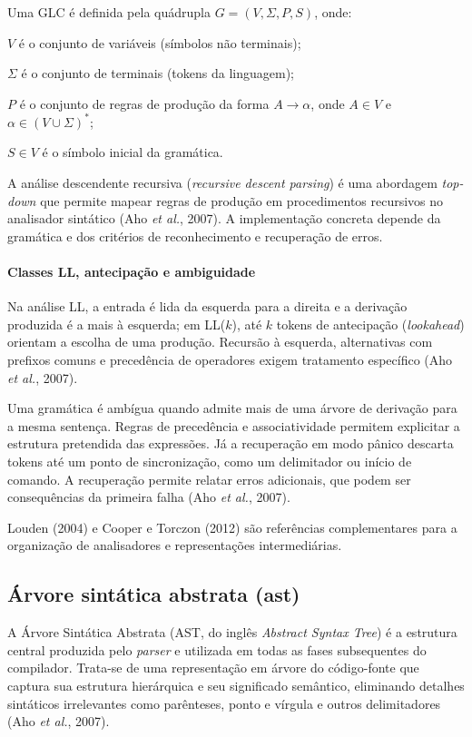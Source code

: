 \documentclass[
    12pt
    ,oneside
    ,a4paper
    ,chapter=TITLE
    ,section=TITLE
    ,sumario=abnt-6027-2012]{abntex2}
\newcommand{\citeAho}{(Aho \textit{et al.}, 2007)}
\begin{document}
Uma GLC é definida pela quádrupla $ G = (V, \Sigma, P, S) $, onde:

\begin{alineas}
    \item $ V $ é o conjunto de variáveis (símbolos não terminais);
    \item $ \Sigma $ é o conjunto de terminais (tokens da linguagem);
    \item $ P $ é o conjunto de regras de produção da forma $ A \rightarrow \alpha $, onde $ A \in V $ e $ \alpha \in (V \cup \Sigma)^* $;
    \item $ S \in V $ é o símbolo inicial da gramática.
\end{alineas}

A análise descendente recursiva (\textit{recursive descent parsing}) é uma
abordagem \textit{top-down} que permite mapear regras de produção em procedimentos
recursivos no analisador sintático \citeAho. A implementação concreta depende da
gramática e dos critérios de reconhecimento e recuperação de erros.

\paragraph*{Classes LL, antecipação e ambiguidade}
Na análise LL, a entrada é lida da esquerda para a direita e a derivação produzida
é a mais à esquerda; em LL($k$), até $k$ tokens de antecipação
(\textit{lookahead}) orientam a escolha de uma produção.  Recursão à esquerda, alternativas com
prefixos comuns e precedência de operadores exigem tratamento específico
\citeAho.

Uma gramática é ambígua quando admite mais de uma árvore de derivação para a
mesma sentença. Regras de precedência e associatividade permitem explicitar a
estrutura pretendida das expressões. Já a recuperação em modo pânico descarta
tokens até um ponto de sincronização, como um delimitador ou início de comando.
A recuperação permite relatar erros adicionais, que podem ser consequências da primeira falha \citeAho.

Louden (2004) e Cooper e Torczon (2012) são referências complementares para a
organização de analisadores e representações intermediárias.

\subsection{Árvore sintática abstrata (ast)}

A Árvore Sintática Abstrata (AST, do inglês \textit{Abstract Syntax Tree}) é a estrutura
central produzida pelo \textit{parser} e utilizada em todas as fases subsequentes do compilador.
Trata-se de uma representação em árvore do código-fonte que captura sua estrutura hierárquica
e seu significado semântico, eliminando detalhes sintáticos irrelevantes como parênteses,
ponto e vírgula e outros delimitadores \citeAho.
\end{document}
